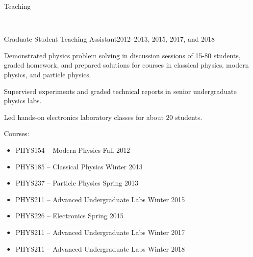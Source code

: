 \documentclass{resume}
\begin{document}
\begin{rsection}{Teaching}

  \\[0.5em]
  \begin{rsubsubsection}{Graduate Student Teaching Assistant}{2012--2013, 2015, 2017, and 2018}
  \item Demonstrated physics problem solving in discussion sessions of 15-80 students, graded homework, and prepared solutions for courses in classical physics, modern physics, and particle physics.
  \item Supervised experiments and graded technical reports in senior undergraduate physics labs.
  \item Led hands-on electronics laboratory classes for about $20$ students.
  \item Courses: \vspace{-0.1cm}
    \begin{itemize}
      \item PHYS154 -- Modern Physics \hfill Fall 2012 \vspace{-0.2cm}
      \item PHYS185 -- Classical Physics \hfill Winter 2013 \vspace{-0.2cm}
      \item PHYS237 -- Particle Physics \hfill Spring 2013 \vspace{-0.2cm}
      \item PHYS211 -- Advanced Undergraduate Labs \hfill Winter 2015 \vspace{-0.2cm}
      \item PHYS226 -- Electronics \hfill Spring 2015 \vspace{-0.2cm}
      \item PHYS211 -- Advanced Undergraduate Labs \hfill Winter 2017 \vspace{-0.2cm}
      \item PHYS211 -- Advanced Undergraduate Labs \hfill Winter 2018 \vspace{-0.2cm}
    \end{itemize}
  \end{rsubsubsection}

\end{rsection}

\newpage

\end{document}
